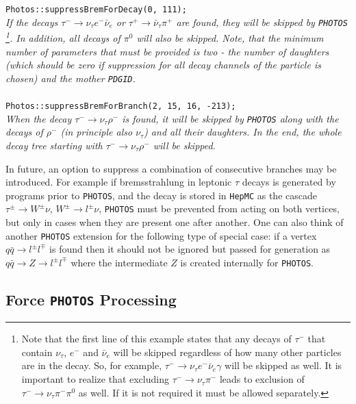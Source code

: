 \documentclass[]{Photos_interface_design}
\begin{document}
\begin{itemize}
{\tt Photos::suppressBremForDecay(0, 111); } \\
\emph{If the decays $\tau^- \rightarrow \nu_\tau e^- \bar \nu_e$ or
      $\tau^+ \rightarrow \bar \nu_\tau \pi^+$ are found, they will be skipped by {\tt PHOTOS}{%
      \footnote{Note that the first line of this example states that any decays of $\tau^-$
      that contain $\nu_\tau$, $e^-$ and $\bar \nu_e$ will be skipped regardless of how many other particles are in the decay.
      So, for example, $\tau^- \rightarrow \nu_\tau e^- \bar \nu_e \gamma$ will be skipped as well. It is important to realize that excluding 
$\tau^-  \rightarrow \nu_\tau \pi^-$ leads to exclusion of
$\tau^- \rightarrow \nu_\tau \pi^-\pi^0$ as well. If it is not required it must be allowed separately.}}.
	  In addition, all decays of $\pi^0$ will also be skipped. Note, that the minimum
	  number of parameters that must be provided is two - the number of daughters
	  (which should be zero if suppression for all decay channels of the particle is chosen) 
	  and the mother {\tt PDGID}.} \\ \\
{\tt Photos::suppressBremForBranch(2, 15, 16, -213); } \\
\emph{When the decay $\tau^- \rightarrow \nu_\tau \rho^-$ is found, it will be skipped by
      {\tt PHOTOS} along with the decays of   $\rho^-$ 
(in principle also $\nu_\tau$) and all
	  their daughters. In the end, the whole decay tree starting with
	  $\tau^- \rightarrow \nu_\tau \rho^-$ will be skipped.}
\end{itemize}

In future, an option to suppress a combination of consecutive branches may be introduced.
For example if bremsstrahlung in leptonic $\tau$ decays is generated by
programs prior to {\tt PHOTOS}, and the decay is stored in {\tt HepMC} as the cascade
$\tau^\pm \to W^\pm \nu$, $W^\pm \to l^\pm \nu$, {\tt PHOTOS} must
be prevented from acting on both vertices, but only in cases when they are present one after another.
One can also think of another {\tt PHOTOS} extension for the following type of special case: if a vertex $q
\bar q \to l^\pm l^\mp$ is found then it should not be ignored but
passed for generation as $q \bar q \to Z \to l^\pm l^\mp$ where
the intermediate $Z$ is created internally for {\tt PHOTOS}.

\subsection{Force {\tt PHOTOS} Processing }
\label{section:force}
\end{document}
